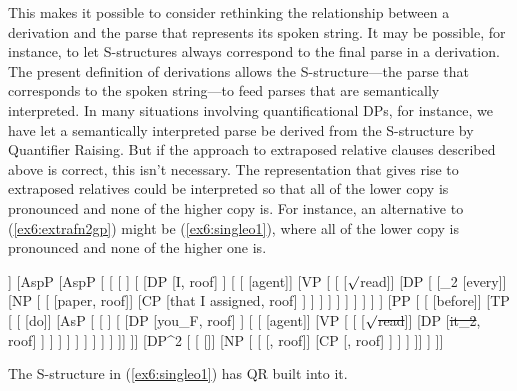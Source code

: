 This makes it possible to consider rethinking the relationship between a derivation and the parse that represents its spoken string. It may be possible, for instance, to let S-structures always correspond to the final parse in a derivation. The present definition of derivations allows the S-structure---the parse that corresponds to the spoken string---to feed parses that are semantically interpreted. In many situations involving quantificational DPs, for instance, we have let a semantically interpreted parse be derived from the S-structure by Quantifier Raising. But if the approach to extraposed relative clauses described above is correct, this isn't necessary. The representation that gives rise to extraposed relatives could be interpreted so that all of the lower copy is pronounced and none of the higher copy is. For instance, an alternative to (\ref{ex6:extrafn2gp}) might be (\ref{ex6:singleo1}), where all of the lower copy is pronounced and none of the higher one is.
\medskip
\begin{fullwidth}
\begin{exe}
\raggedright
	\ex \label{ex6:singleo1}
	\footnotesize
	\begin{forest}
	[TP [\ibar{T}
		[\obar{T} [must]]
		[AspP
			[AspP [
				[
				[ ]
				[
					[DP [I, roof] ]
					[
						[ [agent]]
						[VP [
							[ [$\surd$read]]
							[DP [
								[_2 [every]]
								[NP [
									[ [paper, roof]]
									[CP [that I assigned, roof] ]
								] ]
							] ]
						] ]
					 ]
				 ]
			] 
			[PP [
				[ [before]]
				[TP [
					[ [do]]
					[AsP [
						[ ]
						[
							[DP [you_F, roof] ]
							[
								[ [agent]]
								[VP [
									[ [\sout{$\surd$read}]]
									[DP [\sout{it_2}, roof] ]
								] ]
							 ]
						 ]
					] ]
				] ]
			]]
			]]
			[DP^2 [
				[ []]
				[NP [
					[ [, roof]]
					[CP [, roof] ]
				] ]
			]]
		 ]
	]]
	\end{forest}
\end{exe}
\end{fullwidth}
\medskip
The S-structure in (\ref{ex6:singleo1}) has QR built into it. 

